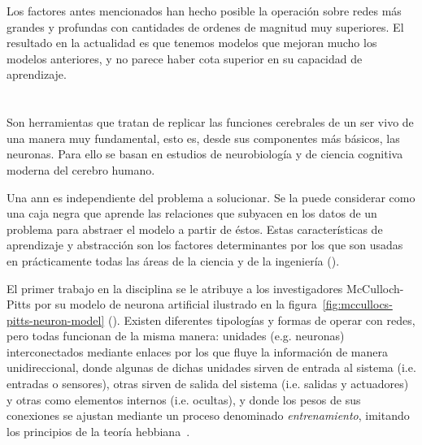 Los factores antes mencionados han hecho posible la operación sobre redes más grandes y profundas con cantidades de ordenes de magnitud muy superiores. El resultado en la actualidad es que tenemos modelos que mejoran mucho los modelos anteriores, y no parece haber cota superior en su capacidad de aprendizaje.

\section{}

Son herramientas que tratan de replicar las funciones cerebrales de un ser vivo de una manera muy fundamental, esto es, desde sus componentes más básicos, las neuronas. Para ello se basan en estudios de neurobiología y de ciencia cognitiva moderna del cerebro humano.

Una \gls{ann} es independiente del problema a solucionar. Se la puede considerar como una caja negra que aprende las relaciones que subyacen en los datos de un problema para abstraer el modelo a partir de éstos. Estas características de aprendizaje y abstracción son los factores determinantes por los que son usadas en prácticamente todas las áreas de la ciencia y de la ingeniería (\cite{Du2006}).

El primer trabajo en la disciplina se le atribuye a  los investigadores McCulloch-Pitts por su modelo de neurona artificial ilustrado en la figura~\ref{fig:mccullocs-pitts-neuron-model} (\cite{McCulloch1943}). Existen diferentes tipologías y formas de operar con redes, pero todas funcionan de la misma manera: unidades (e.g. neuronas) interconectados mediante enlaces por los que fluye la información de manera unidireccional, donde algunas de dichas unidades sirven de entrada al sistema (i.e. entradas o sensores), otras sirven de salida del sistema (i.e. salidas y actuadores) y otras como elementos internos (i.e. ocultas), y donde los pesos de sus conexiones se ajustan mediante un proceso denominado \textit{entrenamiento}, imitando los principios de la teoría hebbiana~\cite{hebb19680}.

